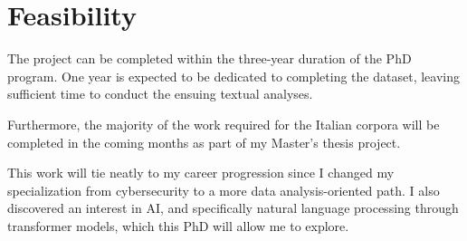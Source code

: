\section{Feasibility}

The project can be completed within the three-year duration of the PhD program. One year is expected to be dedicated to completing the dataset, leaving sufficient time to conduct the ensuing textual analyses. 

Furthermore, the majority of the work required for the Italian corpora will be completed in the coming months as part of my Master's thesis project.

This work will tie neatly to my career progression since I changed my specialization from cybersecurity to a more data analysis-oriented path. I also discovered an interest in AI, and specifically natural language processing through transformer models, which this PhD will allow me to explore.
